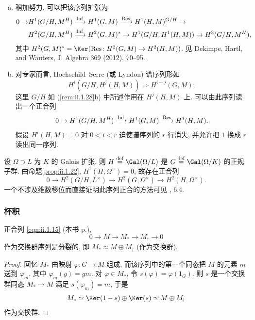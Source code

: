 \begin{remark}\label{rem:ii.1.35}
\begin{enumerate}[(a)]
\item 稍加努力, 可以把该序列扩张为
\[
 \begin{aligned}
 0\to &H^1(G/H,M^H)\xrightarrow{\operatorname{Inf}} H^1(G,M)\xrightarrow{\operatorname{Res}} H^1(H,M)^{G/H}\to\\
 &H^2(G/H,M^H)\xrightarrow{\operatorname{Inf}} H^2(G,M)^*\to H^1(G/H,H^1(H,M))\to H^3(G/H,M^H),
 \end{aligned}
\]
其中 $H^2(G,M)^*=\Ker(\Res\colon H^2(G,M)\to H^2(H,M))$. 见 Dekimpe, Hartl, and Wauters, J. Algebra 369 (2012), 70--95.
\item 对专家而言, Hochschild--Serre (或 Lyndon) 谱序列形如
\[
 H^i(G/H,H^j(H,M))\Rightarrow H^{i+j}(G,M);
\]
这里 $G/H$ 如 (\ref{rem:ii.1.28}b) 中所述作用在 $H^j(H,M)$ 上. 可以由此序列读出一个正合列
\[
 0\to H^1(G/H,M^H)\xrightarrow{\operatorname{Inf}} H^1(G,M)\xrightarrow{\operatorname{Res}} H^1(H,M).
\]
假设 $H^i(H,M)=0$ 对 $0<i<r$ 迫使谱序列的 $r$ 行消失, 并允许把 $1$ 换成 $r$ 读出同一序列.
\end{enumerate}
\end{remark}

\begin{example}\label{ex:ii.1.36}
设 $\Omega\supset L$ 为 $K$ 的 Galois 扩张. 则 $H\stackrel{\mathrm{def}}{=}\Gal(\Omega/L)$ 是 $G\stackrel{\mathrm{def}}{=}\Gal(\Omega/K)$ 的正规子群. 由命题\ref{prop:ii.1.22}, $H^1(H,\Omega^\times)=0$, 故存在正合列
\[
 0\to H^2(G/H,L^\times)\to H^2(G,\Omega^\times)\to H^2(H,\Omega^\times).
\]
一个不涉及维数移位而直接证明此序列正合的方法可见 \cite{Artin1951}, 6.4.
\end{example}

\subsubsection*{杯积}

\begin{lemma}\label{lem:ii.1.37}
正合列 \ref{eqn:ii.1.15} (本书 p.\pageref{eqn:ii.1.15}),
\[
 0\to M\to M_*\to M_\dagger\to 0
\]
作为交换群序列是分裂的, 即 $M_*\approx M\oplus M_\dagger$ (作为交换群).
\end{lemma}

\begin{proof}
回忆 $M_*$ 由映射 $\varphi\colon G\to M$ 组成, 而该序列中的第一个同态把 $M$ 的元素 $m$ 送到 $\varphi_m$, 其中 $\varphi_m(g)=gm$. 对 $\varphi\in M_*$, 令 $s(\varphi)=\varphi(1_G)$. 则 $s$ 是一个交换群同态 $M_*\to M$ 满足 $s(\varphi_m)=m$, 于是
\[
 M_*\simeq \Ker(1-s)\oplus \Ker(s)\simeq M\oplus M_\dagger
\]
作为交换群.
\end{proof}


